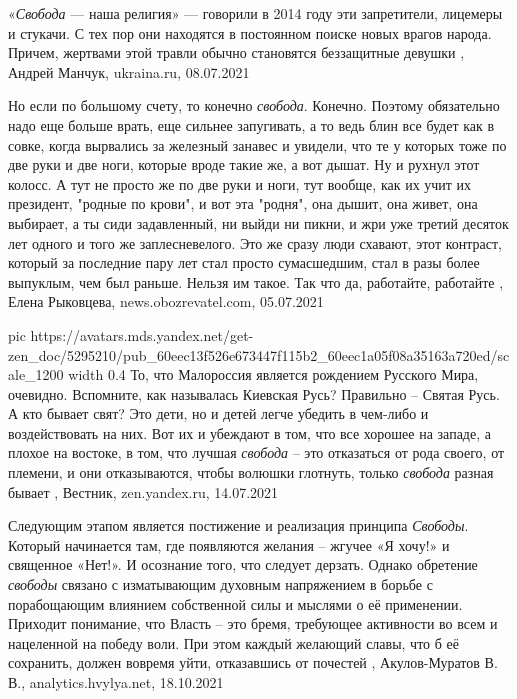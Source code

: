 «\emph{Свобода} — наша религия» — говорили в 2014 году эти запретители, лицемеры и
стукачи. С тех пор они находятся в постоянном поиске новых врагов народа.
Причем, жертвами этой травли обычно становятся беззащитные девушки
, 
Андрей Манчук, ukraina.ru, 08.07.2021

Но если по большому счету, то конечно \emph{свобода}. Конечно. Поэтому
обязательно надо еще больше врать, еще сильнее запугивать, а то ведь блин все
будет как в совке, когда вырвались за железный занавес и увидели, что те у
которых тоже по две руки и две ноги, которые вроде такие же, а вот дышат. Ну и
рухнул этот колосс. А тут не просто же по две руки и ноги, тут вообще, как их
учит их президент, "родные по крови", и вот эта "родня", она дышит, она живет,
она выбирает, а ты сиди задавленный, ни выйди ни пикни, и жри уже третий
десяток лет одного и того же заплесневелого. Это же сразу люди схавают, этот
контраст, который за последние пару лет стал просто сумасшедшим, стал в разы
более выпуклым, чем был раньше. Нельзя им такое. Так что да, работайте,
работайте
, 
Елена Рыковцева, news.obozrevatel.com, 05.07.2021

\ifcmt
  pic https://avatars.mds.yandex.net/get-zen_doc/5295210/pub_60eec13f526e673447f115b2_60eec1a05f08a35163a720ed/scale_1200
  width 0.4
\fi
То, что Малороссия является рождением Русского Мира, очевидно. Вспомните, как
называлась Киевская Русь? Правильно – Святая Русь. А кто бывает свят? Это дети,
но и детей легче убедить в чем-либо и воздействовать на них. Вот их и убеждают
в том, что все хорошее на западе, а плохое на востоке, в том, что лучшая
\emph{свобода} – это отказаться от рода своего, от племени, и они отказываются, чтобы
волюшки глотнуть, только \emph{свобода} разная бывает
, Вестник, zen.yandex.ru, 14.07.2021

Следующим этапом является постижение и реализация принципа \emph{Свободы}. Который
начинается там, где появляются желания – жгучее «Я хочу!» и священное «Нет!». И
осознание того, что следует дерзать. Однако обретение \emph{свободы} связано с
изматывающим духовным напряжением в борьбе с порабощающим влиянием собственной
силы и мыслями о её применении. Приходит понимание, что Власть – это бремя,
требующее активности во всем и нацеленной на победу воли. При этом каждый
желающий славы, что б её сохранить, должен вовремя уйти, отказавшись от
почестей
, 
Акулов-Муратов В. В., analytics.hvylya.net, 18.10.2021

